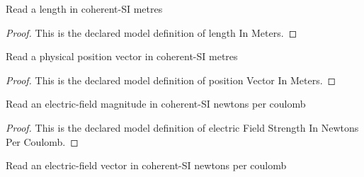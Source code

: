 \begin{definition}
  \label{def:physics:phyx-mini-0996:phyxminiproblems-problemphyxmini0996-lengthinmeters}
  Read a length in coherent-SI metres
\end{definition}
\begin{proof}
  This is the declared model definition of length In Meters.
\end{proof}
\begin{definition}
  \label{def:physics:phyx-mini-0996:phyxminiproblems-problemphyxmini0996-positionvectorinmeters}
  Read a physical position vector in coherent-SI metres
\end{definition}
\begin{proof}
  This is the declared model definition of position Vector In Meters.
\end{proof}
\begin{definition}
  \label{def:physics:phyx-mini-0996:phyxminiproblems-problemphyxmini0996-electricfieldstrengthinnewtonspercoulomb}
  Read an electric-field magnitude in coherent-SI newtons per coulomb
\end{definition}
\begin{proof}
  This is the declared model definition of electric Field Strength In Newtons Per Coulomb.
\end{proof}
\begin{definition}
  \label{def:physics:phyx-mini-0996:phyxminiproblems-problemphyxmini0996-electricfieldvectorinnewtonspercoulomb}
  Read an electric-field vector in coherent-SI newtons per coulomb
\end{definition}
